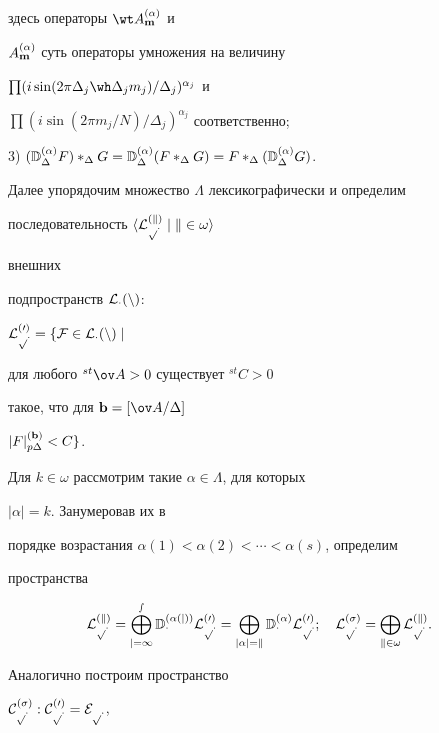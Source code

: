 \noindent здесь операторы $\wt A^{(\alpha)}_{\bold m}$ и 


$A^{(\alpha)}_{\bold m}$ суть операторы умножения на величину 


$\prod(i\sin(2\pi\Delta_j\wh\Delta_j m_j)/ \Delta_j)^{\alpha_j}$ и 


$\prod(i\sin(2\pi m_j/N)/\Delta_j)^{\alpha_j}$ соответственно;


 


3) $(\Bbb D^{(\alpha)}_\Delta F)*_\Delta G=\Bbb D^{(\alpha)}_\Delta 


(F*_\Delta G)=F*_\Delta(\Bbb D^{(\alpha)}_\Delta G)$. 


 


Далее упорядочим множество $\Lambda$ лексикографически и определим 


последовательность $\langle\cal L^{(k)}_{p\Delta}\mid k\in\omega\rangle$ 


внешних 


подпространств $\cal L_\Delta(n)$: 


$\cal L^{(0)}_{p\Delta}=\{F\in\cal L_\Delta(n)\mid$


для любого ${}^{st}\ov A>0$ существует ${}^{st}C>0$


такое, что для $\bold b=[\ov A/\Delta]$\; 


$|F|^{(\bold b)}_{p\Delta}<C\}$. 


Для $k\in\omega$ рассмотрим такие $\alpha\in\Lambda$, для которых 


$|\alpha|=k$. Занумеровав их в 


порядке возрастания $\alpha(1)<\alpha(2)<\dotsb<\alpha(s)$, определим 


пространства 


$$ 


\cal L^{(k)}_{p\Delta}=\bigoplus^s_{j=1} 


\Bbb D^{(\alpha(j))}_\Delta\cal L^{(0)}_{p\Delta}= 


\bigoplus_{|\alpha|=k}\Bbb D^{(\alpha)}_\Delta 


\cal L^{(0)}_{p\Delta};\quad 


\cal L^{(\sigma)}_{p\Delta}=\bigoplus_{k\in\omega} 


\cal L^{(k)}_{p\Delta}. 


$$ 


 


Аналогично построим пространство 


$\cal C^{(\sigma)}_{p\Delta}:\cal C^{(0)}_{p\Delta}=E_{p\Delta}$, 


